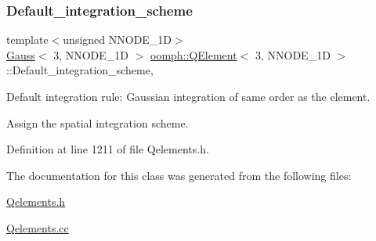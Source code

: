 \subsubsection{\texorpdfstring{Default\+\_\+integration\+\_\+scheme}{Default\_integration\_scheme}}
{\footnotesize\ttfamily template$<$unsigned N\+N\+O\+D\+E\+\_\+1D$>$ \\
\hyperlink{classoomph_1_1Gauss}{Gauss}$<$ 3, N\+N\+O\+D\+E\+\_\+1D $>$ \hyperlink{classoomph_1_1QElement}{oomph\+::\+Q\+Element}$<$ 3, N\+N\+O\+D\+E\+\_\+1D $>$\+::Default\+\_\+integration\+\_\+scheme\hspace{0.3cm}{\ttfamily [static]}, {\ttfamily [private]}}



Default integration rule\+: Gaussian integration of same \textquotesingle{}order\textquotesingle{} as the element. 

Assign the spatial integration scheme. 

Definition at line 1211 of file Qelements.\+h.



The documentation for this class was generated from the following files\+:\begin{DoxyCompactItemize}
\item 
\hyperlink{Qelements_8h}{Qelements.\+h}\item 
\hyperlink{Qelements_8cc}{Qelements.\+cc}\end{DoxyCompactItemize}
